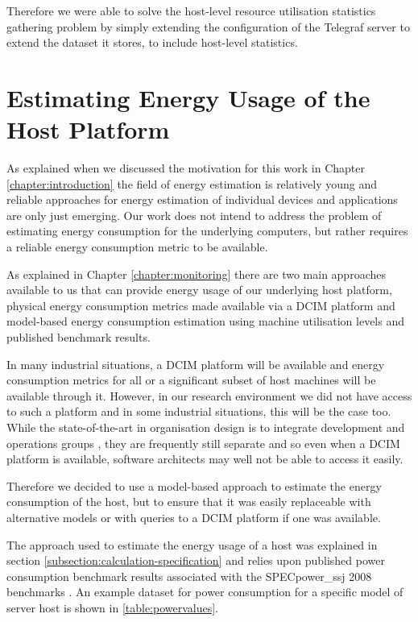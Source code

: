 Therefore we were able to solve the host-level resource utilisation statistics gathering problem by simply extending the configuration of the Telegraf server to extend the dataset it stores, to include host-level statistics.

\section{Estimating Energy Usage of the Host Platform}

As explained when we discussed the motivation for this work in Chapter \ref{chapter:introduction} the field of energy estimation is relatively young and reliable approaches for energy estimation of individual devices and applications are only just emerging.  Our work does not intend to address the problem of estimating energy consumption for the underlying computers, but rather requires a reliable energy consumption metric to be available.

As explained in Chapter \ref{chapter:monitoring} there are two main approaches available to us that can provide energy usage of our underlying host platform, physical energy consumption metrics made available via a DCIM platform and model-based energy consumption estimation using machine utilisation levels and published benchmark results.

In many industrial situations, a DCIM platform will be available and energy consumption metrics for all or a significant subset of host machines will be available through it.  However, in our research environment we did not have access to such a platform and in some industrial situations, this will be the case too.  While the state-of-the-art in organisation design is to integrate development and operations groups \cite{kim2016-devops}, they are frequently still separate and so even when a DCIM platform is available, software architects may well not be able to access it easily.

Therefore we decided to use a model-based approach to estimate the energy consumption of the host, but to ensure that it was easily replaceable with alternative models or with queries to a DCIM platform if one was available.

The approach used to estimate the energy usage of a host was explained in section \ref{subsection:calculation-specification} and relies upon published power consumption benchmark results associated with the SPECpower\_ssj 2008 benchmarks \cite{lange2009-specpower}.  An example dataset for power consumption for a specific model of server host is shown in \ref{table:powervalues}.

